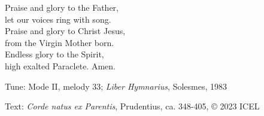 \hymn



\begin{underhymnverse}
Praise and glory to the Father,\\
let our voices ring with song.\\
Praise and glory to Christ Jesus,\\
from the Virgin Mother born.\\
Endless glory to the Spirit,\\
high exalted Paraclete. Amen.
\end{underhymnverse}

\begin{hymnsource}
Tune: Mode II, melody 33; \emph{Liber Hymnarius}, Solesmes, 1983

Text: \emph{Corde natus ex Parentis}, Prudentius, ca. 348-405, © 2023 ICEL
\end{hymnsource}
